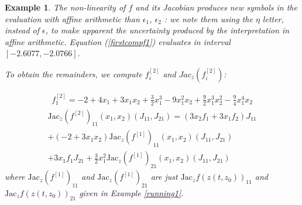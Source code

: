 \documentclass{sig-alternate-05-2015}
\newtheorem{example}{Example}
\def\intvl#1{\mbox{$[ #1 ]$}}
\begin{document}
\begin{example}
The non-linearity of $f$ and its Jacobian produces new symbols in the evaluation with affine arithmetic than $\epsilon_1$,
$\epsilon_2$ : we note them using the $\eta$ letter, instead of $\epsilon$, to make apparent the uncertainty
produced by the interpretation in affine arithmetic. 
Equation (\ref{firstcompf1}) evaluates in interval
 $\left[-2.6077,-2.0766\right]$.

To obtain the remainders, we compute $f_i^{[2]}$ and  $Jac_z(f_i^{[2]})$: 

\begin{multline}
{f}_1^{[2]} = -2+4x_1+3x_1x_2+\frac{3}{2}x_1^3-9x_1^2x_2
+\frac{9}{2}x_1^3x_2^2-\frac{9}{4}x_1^4x_2
\end{multline}
\begin{multline}
\mbox{Jac}_z(f^{[2]})_{11}(x_1,x_2)(J_{11},J_{21}) = (3x_2f_1+3x_1f_2)J_{11}\\
+(-2+3x_1x_2)\mbox{Jac}_z(f^{[1]})_{11}(x_1,x_2)(J_{11},J_{21}) \\ 
+3x_1f_1J_{21}+\frac{3}{2}x_1^2{\mbox{Jac}_z(f^{[1]})}_{21}(x_1,x_2)(J_{11},J_{21}) 
\label{secondderivative}
\end{multline} %
\noindent where $\mbox{Jac}_z(f^{[1]})_{11}$ %
and ${\mbox{Jac}_z(f^{[1]})}_{21}$ %
are just $\mbox{Jac}_z f(z(t,z_0))_{11}$ and $\mbox{Jac}_z f(z(t,z_0))_{21}$ given in Example \ref{running1}.


\end{example}
\end{document}

